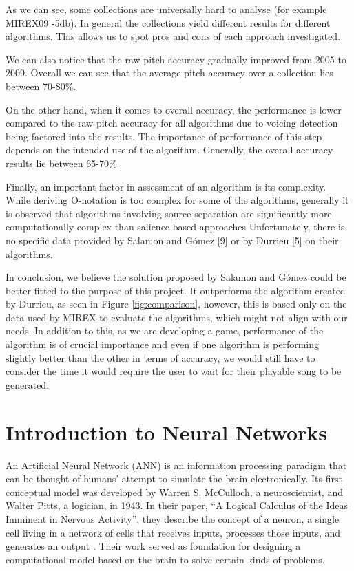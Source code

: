 As we can see, some collections are universally hard to analyse (for example MIREX09 -5db). In general the collections yield different results for different algorithms. This allows us to spot pros and cons of each approach investigated.

We can also notice that the raw pitch accuracy gradually improved from 2005 to 2009. Overall we can see that the average pitch accuracy over a collection lies between 70-80\%.

On the other hand, when it comes to overall accuracy, the performance is lower compared to the raw pitch accuracy for all algorithms due to voicing detection being factored into the results. The importance of performance of this step depends on the intended use of the algorithm. Generally, the overall accuracy results lie between 65-70\%.

Finally, an important factor in assessment of an algorithm is its complexity. While deriving O-notation is too complex for some of the algorithms, generally it is observed that algorithms involving source separation are significantly more computationally complex than salience based approaches Unfortunately, there is no specific data provided by Salamon and G\'{o}mez [9] or by Durrieu [5] on their algorithms.

In conclusion, we believe the solution proposed by Salamon and G\'{o}mez could be better fitted to the purpose of this project. It outperforms the algorithm created by Durrieu, as seen in Figure \ref{fig:comparison}, however, this is based only on the data used by MIREX to evaluate the algorithms, which might not align with our needs. In addition to this, as we are developing a game, performance of the algorithm is of crucial importance and even if one algorithm is performing slightly better than the other in terms of accuracy, we would still have to consider the time it would require the user to wait for their playable song to be generated. 

\vspace{40pt}


\section{Introduction to Neural Networks}

An Artificial Neural Network (ANN) is an information processing paradigm that can be thought of humans' attempt to simulate the brain electronically. Its first conceptual model was developed by Warren S. McCulloch, a neuroscientist, and Walter Pitts, a logician, in 1943. In their paper, ``A Logical Calculus of the Ideas Imminent in Nervous Activity'', they describe the concept of a neuron, a single cell living in a network of cells that receives inputs, processes those inputs, and generates an output \cite{firstNN}. Their work served as foundation for designing a computational model based on the brain to solve certain kinds of problems.

